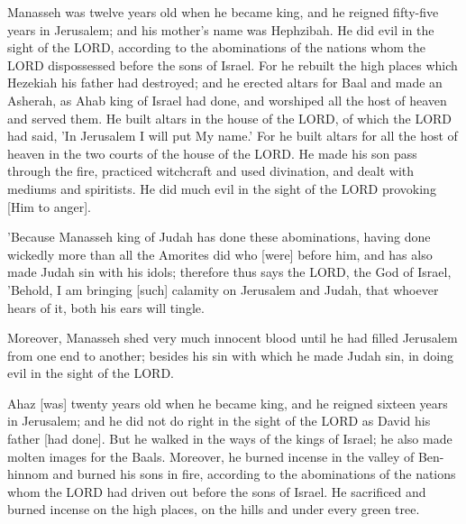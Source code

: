 \vspace{2\baselineskip}

\begin{scripture}[2 Kings 21:1-6]
    Manasseh was twelve years old when he became king, and he reigned fifty-five years in Jerusalem; and his mother's name was Hephzibah.
    He did evil in the sight of the LORD, according to the abominations of the nations whom the LORD dispossessed before the sons of Israel.
    For he rebuilt the high places which Hezekiah his father had destroyed; and he erected altars for Baal and made an Asherah, as Ahab king of Israel had done, and worshiped all the host of heaven and served them.
    He built altars in the house of the LORD, of which the LORD had said, 'In Jerusalem I will put My name.'
    For he built altars for all the host of heaven in the two courts of the house of the LORD.
    He made his son pass through the fire, practiced witchcraft and used divination, and dealt with mediums and spiritists. He did much evil in the sight of the LORD provoking [Him to anger].
\end{scripture}

\vspace{2\baselineskip}

\begin{scripture}[2 Kings 21:11-12]
    'Because Manasseh king of Judah has done these abominations, having done wickedly more than all the Amorites did who [were] before him, and has also made Judah sin with his idols;
    therefore thus says the LORD, the God of Israel, 'Behold, I am bringing [such] calamity on Jerusalem and Judah, that whoever hears of it, both his ears will tingle.
\end{scripture}

\vspace{2\baselineskip}

\begin{scripture}[2 Kings 21:16]
    Moreover, Manasseh shed very much innocent blood until he had filled Jerusalem from one end to another; besides his sin with which he made Judah sin, in doing evil in the sight of the LORD.
\end{scripture}

\vspace{2\baselineskip}

\begin{scripture}[2 Chronicles 28:1-4]
    Ahaz [was] twenty years old when he became king, and he reigned sixteen years in Jerusalem; and he did not do right in the sight of the LORD as David his father [had done].
    But he walked in the ways of the kings of Israel; he also made molten images for the Baals.
    Moreover, he burned incense in the valley of Ben-hinnom and burned his sons in fire, according to the abominations of the nations whom the LORD had driven out before the sons of Israel.
    He sacrificed and burned incense on the high places, on the hills and under every green tree.
\end{scripture}

\vspace{2\baselineskip}
